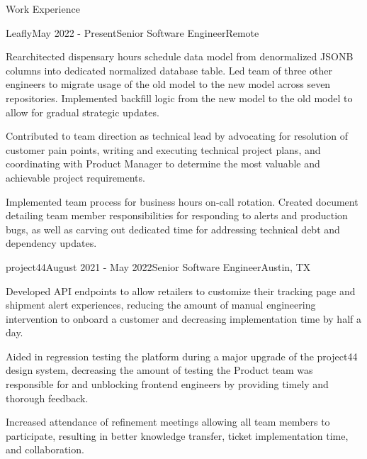 \documentclass{resume} %
\begin{document}

\begin{rSection}{Work Experience}


\begin{rSubsection}{Leafly}{May 2022 - Present}{Senior Software Engineer}{Remote}
\item Rearchitected dispensary hours schedule data model from denormalized JSONB columns into dedicated normalized database table. Led team of
three other engineers to migrate usage of the old model to the new model across seven repositories. Implemented backfill logic from the new model
to the old model to allow for gradual strategic updates.
\item Contributed to team direction as technical lead by advocating for resolution of customer pain points, writing and executing technical project plans,
and coordinating with Product Manager to determine the most valuable and achievable project requirements.
\item Implemented team process for business hours on-call rotation. Created document detailing team member responsibilities for responding to alerts and
production bugs, as well as carving out dedicated time for addressing technical debt and dependency updates.
\end{rSubsection}


\begin{rSubsection}{project44}{August 2021 - May 2022}{Senior Software Engineer}{Austin, TX}
\item Developed API endpoints to allow retailers to customize their tracking page and shipment alert experiences, reducing the
amount of manual engineering intervention to onboard a customer and decreasing implementation time by half a day.
\item Aided in regression testing the platform during a major upgrade of the project44 design system, decreasing the amount of
testing the Product team was responsible for and unblocking frontend engineers by providing timely and thorough feedback.
\item Increased attendance of refinement meetings allowing all team members to participate, resulting in better knowledge transfer,
ticket implementation time, and collaboration.
\end{rSubsection}


\end{rSection}
\end{document}
